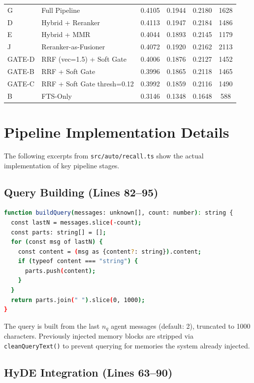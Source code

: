 \documentclass[11pt]{article}
\begin{document}
\begin{longtable}{llcccc}
G & Full Pipeline & 0.4105 & 0.1944 & 0.2180 & 1628 \\
D & Hybrid + Reranker & 0.4113 & 0.1947 & 0.2184 & 1486 \\
E & Hybrid + MMR & 0.4044 & 0.1893 & 0.2145 & 1179 \\
J & Reranker-as-Fusioner & 0.4072 & 0.1920 & 0.2162 & 2113 \\
GATE-D & RRF (vec=1.5) + Soft Gate & 0.4006 & 0.1876 & 0.2127 & 1452 \\
GATE-B & RRF + Soft Gate & 0.3996 & 0.1865 & 0.2118 & 1465 \\
GATE-C & RRF + Soft Gate thresh=0.12 & 0.3992 & 0.1859 & 0.2116 & 1490 \\
B & FTS-Only & 0.3146 & 0.1348 & 0.1648 & 588 \\
\end{longtable}

\section{Pipeline Implementation Details}
\label{sec:appendix-pipeline}

The following excerpts from \texttt{src/auto/recall.ts} show the actual implementation of key pipeline stages.

\subsection{Query Building (Lines 82--95)}

\begin{lstlisting}[language=bash, caption={Query construction from recent messages}]
function buildQuery(messages: unknown[], count: number): string {
  const lastN = messages.slice(-count);
  const parts: string[] = [];
  for (const msg of lastN) {
    const content = (msg as {content?: string}).content;
    if (typeof content === "string") {
      parts.push(content);
    }
  }
  return parts.join(" ").slice(0, 1000);
}
\end{lstlisting}

The query is built from the last $n_q$ agent messages (default: 2), truncated to 1000 characters. Previously injected memory blocks are stripped via \texttt{cleanQueryText()} to prevent querying for memories the system already injected.

\subsection{HyDE Integration (Lines 63--90)}
\end{document}
